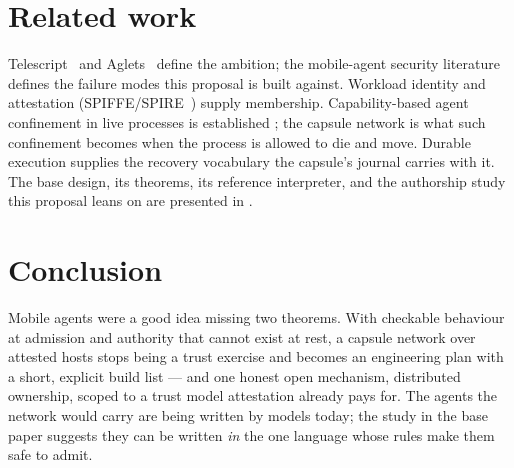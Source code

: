 \documentclass[sigplan,10pt]{acmart}
\begin{document}
\section{Related work}

Telescript~\cite{white1996telescript} and Aglets~\cite{lange1998aglets}
define the ambition; the mobile-agent security literature
\cite{chess1998mobile} defines the failure modes this proposal is built
against. Workload identity and attestation
(SPIFFE/SPIRE~\cite{spiffe}) supply membership. Capability-based agent
confinement in live processes is established
\cite{odersky2026securing,debenedetti2025camel}; the capsule network is
what such confinement becomes when the process is allowed to die and
move. Durable execution \cite{burckhardt2021durable} supplies the
recovery vocabulary the capsule's journal carries with it. The base
design, its theorems, its reference interpreter, and the authorship
study this proposal leans on are presented in \cite{entoli2026}.

\section{Conclusion}

Mobile agents were a good idea missing two theorems. With checkable
behaviour at admission and authority that cannot exist at rest, a
capsule network over attested hosts stops being a trust exercise and
becomes an engineering plan with a short, explicit build list --- and
one honest open mechanism, distributed ownership, scoped to a trust
model attestation already pays for. The agents the network would carry
are being written by models today; the study in the base paper suggests
they can be written \emph{in} the one language whose rules make them
safe to admit.



\end{document}
